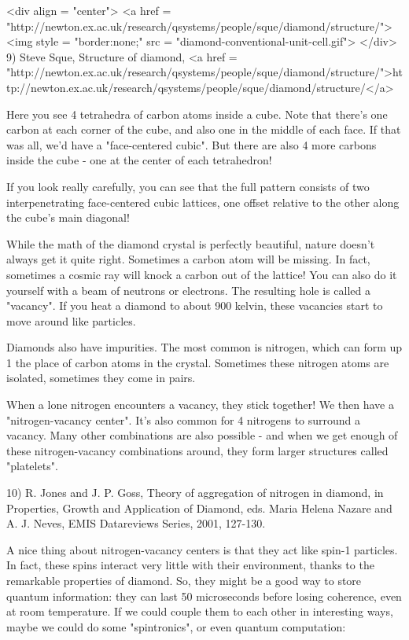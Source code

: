 <div align = "center">
<a href = "http://newton.ex.ac.uk/research/qsystems/people/sque/diamond/structure/">
<img style = "border:none;" src = "diamond-conventional-unit-cell.gif">
</div>
9) Steve Sque, Structure of diamond, 
<a href = "http://newton.ex.ac.uk/research/qsystems/people/sque/diamond/structure/">http://newton.ex.ac.uk/research/qsystems/people/sque/diamond/structure/</a>

Here you see 4 tetrahedra of carbon atoms inside a cube.  
Note that there's one carbon at each corner of the cube, and 
also one in the middle of each face.  If that was all, we'd 
have a "face-centered cubic".  But there are also 4 more 
carbons inside the cube - one at the center of each tetrahedron!

If you look really carefully, you can see that the full 
pattern consists of two interpenetrating face-centered 
cubic lattices, one offset relative to the other along the 
cube's main diagonal!

While the math of the diamond crystal is perfectly beautiful, 
nature doesn't always get it quite right.  Sometimes a carbon 
atom will be missing.  In fact, sometimes a cosmic ray will 
knock a carbon out of the lattice!  You can also do it yourself 
with a beam of neutrons or electrons.  The resulting hole is 
called a "vacancy".  If you heat a diamond to about 900 
kelvin, these vacancies start to move around like particles.

Diamonds also have impurities.  The most common is nitrogen, 
which can form up 1%
the place of carbon atoms in the crystal.  Sometimes these 
nitrogen atoms are isolated, sometimes they come in pairs. 

When a lone nitrogen encounters a vacancy, they stick together!  
We then have a "nitrogen-vacancy center".  It's also common for 
4 nitrogens to surround a vacancy.  Many other combinations are 
also possible - and when we get enough of these nitrogen-vacancy 
combinations around, they form larger structures called 
"platelets".

10) R. Jones and J. P. Goss, Theory of aggregation of nitrogen 
in diamond, in Properties, Growth and Application of Diamond, 
eds. Maria Helena Nazare and A. J. Neves, EMIS Datareviews 
Series, 2001, 127-130.

A nice thing about nitrogen-vacancy centers is that they act 
like spin-1 particles.  In fact, these spins interact very 
little with their environment, thanks to the remarkable properties 
of diamond.  So, they might be a good way to store quantum 
information: they can last 50 microseconds before losing 
coherence, even at room temperature.   If we could couple them
to each other in interesting ways, maybe we could do some 
"spintronics", or even quantum computation:

